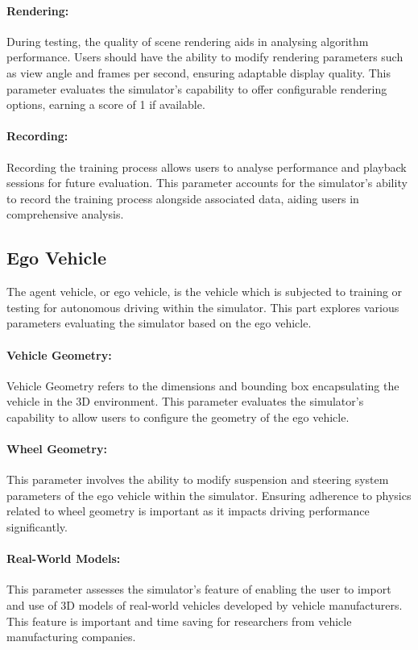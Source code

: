 \documentclass[12pt,twoside,a4paper,parskip]{scrbook} %
\begin{document}
\paragraph*{Rendering:}
During testing, the quality of scene rendering aids in analysing algorithm performance. Users should have the ability to modify rendering parameters such as view angle and frames per second, ensuring adaptable display quality. This parameter evaluates the simulator's capability to offer configurable rendering options, earning a score of 1 if available.
\paragraph*{Recording:}
Recording the training process allows users to analyse performance and playback sessions for future evaluation. This parameter accounts for the simulator's ability to record the training process alongside associated data, aiding users in comprehensive analysis.

\subsection{Ego Vehicle}
The agent vehicle, or ego vehicle, is the vehicle which is subjected to training or testing for autonomous driving within the simulator. This part explores various parameters evaluating the simulator based on the ego vehicle.

\paragraph*{Vehicle Geometry:}
Vehicle Geometry refers to the dimensions and bounding box encapsulating the vehicle in the 3D environment. This parameter evaluates the simulator's capability to allow users to configure the geometry of the ego vehicle.

\paragraph*{Wheel Geometry:}
This parameter involves the ability to modify suspension and steering system parameters of the ego vehicle within the simulator. Ensuring adherence to physics related to wheel geometry is important as it impacts driving performance significantly.

\paragraph*{Real-World Models:}
This parameter assesses the simulator's feature of enabling the user to import and use of 3D models of real-world vehicles developed by vehicle manufacturers. This feature is important and time saving for researchers from vehicle manufacturing companies.
\end{document}
